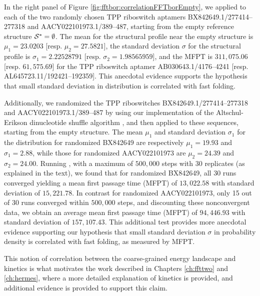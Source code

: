In the right panel of Figure \ref{fig:fftbor:correlationFFTborEmpty}, we
applied \fftbor to each of the two randomly chosen TPP riboswitch
aptamers BX842649.1/277414--277318 and AACY022101973.1/389--487, starting
from the empty reference structure $\mathcal S^*=\emptyset$.
The mean for the \fftbor structural profile near the empty
structure is $\mu_1=23.0203$  [resp. $\mu_2=27.5821$], the
standard deviation $\sigma$ for the \fftbor structural profile
is $\sigma_1=2.22528791$  [resp. $\sigma_2=1.98565959$], and the \kinfold MFPT is
$311,075.06$ [resp. $61,575.69$] for the TPP riboswitch aptamer
AB030643.1/4176--4241 [resp.  AL645723.11/192421--192359]. This anecdotal evidence supports the hypothesis that small standard deviation in \fftbor distribution is correlated with fast folding.

Additionally, we randomized the TPP riboswitches BX842649.1/277414--277318 and AACY022101973.1/389--487 by using our implementation of the Altschul-Erikson dinucleotide shuffle algorithm
\cite{altschulErikson:dinucleotideShuffle}, and then applied \fftbor to these
sequences, starting from the empty structure.  The mean $\mu_1$ and standard
deviation $\sigma_1$ for the \fftbor distribution for randomized BX842649 are
respectively $\mu_1=19.93$ and $\sigma_1=2.88$, while those for randomized
AACY022101973 are $\mu_2=24.39$ and $\sigma_2=24.00$. Running \kinfold, with a
maximum of $500,000$ steps with 30 replicates (as explained in the text), we
found
that for randomized BX842649, all 30 runs converged yielding a mean first passage
time (MFPT) of $13,022.58$ with standard deviation of $15,221.78$. In contrast for
randomized AACY022101973, only 15 out of 30 runs converged within $500,000$ steps,
and discounting these nonconvergent data, we obtain an average mean first passage
time (MFPT) of $94,446.93$ with standard deviation of $157,107.43$. This additional
test provides more anecdotal evidence supporting our hypothesis that small
standard deviation $\sigma$ in \fftbor probability density is correlated with fast folding, as measured by MFPT.

This notion of correlation between the coarse-grained energy landscape and
kinetics is what motivates the work described in Chapters \ref{ch:ffttwo}
and \ref{ch:hermes}, where a more detailed explanation of kinetics is provided,
and additional evidence is provided to support this claim.


